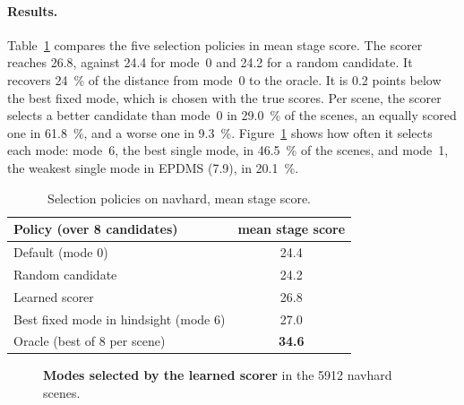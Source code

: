 \documentclass[11pt, a4paper, oneside]{book}
\begin{document}
\paragraph{Results.} Table~\ref{tab:selection} compares the five selection policies in mean stage
score. The scorer reaches \num{26.8}, against \num{24.4} for mode~0 and \num{24.2} for a random
candidate. It recovers \SI{24}{\percent} of the distance from mode~0 to the oracle. It is
\num{0.2} points below the best fixed mode, which is chosen with the true scores. Per scene, the
scorer selects a better candidate than mode~0 in \SI{29.0}{\percent} of the scenes, an equally
scored one in \SI{61.8}{\percent}, and a worse one in \SI{9.3}{\percent}. Figure~\ref{fig:selhist}
shows how often it selects each mode: mode~6, the best single mode, in \SI{46.5}{\percent} of the
scenes, and mode~1, the weakest single mode in EPDMS (\num{7.9}), in \SI{20.1}{\percent}.

\begin{table}[ht]
\centering
\caption[Selection policies on navhard]{Selection policies on navhard, mean stage score.}
\label{tab:selection}
\begin{tabular}{lc}
\toprule
Policy (over 8 candidates) & mean stage score \\
\midrule
Default (mode 0)                      & 24.4 \\
Random candidate                      & 24.2 \\
Learned scorer                        & 26.8 \\
Best fixed mode in hindsight (mode 6) & 27.0 \\
Oracle (best of 8 per scene)          & \textbf{34.6} \\
\bottomrule
\end{tabular}
\end{table}

\begin{figure}[ht]
\centering
{}
\caption[Modes selected by the learned scorer]{\textbf{Modes selected by the learned scorer}
in the \num{5912} navhard scenes.}
\label{fig:selhist}
\end{figure}
\end{document}
